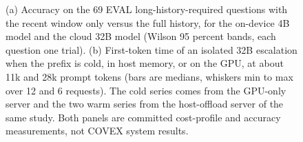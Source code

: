 \documentclass[sigconf]{acmart}
\begin{document}
{\selectfont
\begin{figure}[t]
  \centering
  
  \caption{(a) Accuracy on the 69 EVAL long-history-required questions with the recent window only versus the full history, for the on-device 4B model and the cloud 32B model (Wilson 95 percent bands, each question one trial). (b) First-token time of an isolated 32B escalation when the prefix is cold, in host memory, or on the GPU, at about 11k and 28k prompt tokens (bars are medians, whiskers min to max over 12 and 6 requests). The cold series comes from the GPU-only server and the two warm series from the host-offload server of the same study. Both panels are committed cost-profile and accuracy measurements, not COVEX system results.}
  \label{fig:F16_history_and_warm}
\end{figure}
}


\end{document}
